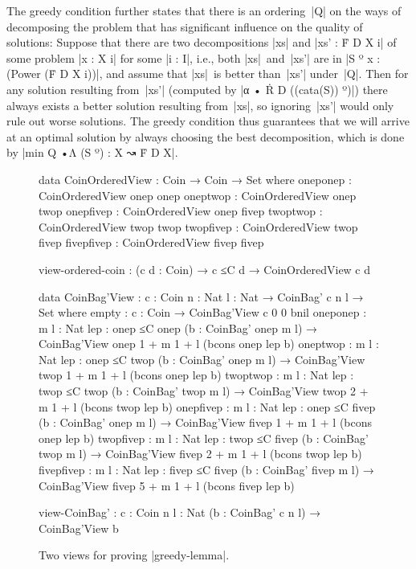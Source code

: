 The greedy condition further states that there is an ordering~|Q| on the ways of decomposing the problem that has significant influence on the quality of solutions:
Suppose that there are two decompositions |xs| and |xs' : Ḟ D X i| of some problem |x : X i| for some |i : I|, i.e., both |xs|~and~|xs'| are in |S º x : (Power (Ḟ D X i))|, and assume that |xs|~is better than~|xs'| under~|Q|.
Then for any solution resulting from~|xs'| (computed by |α • Ṙ D ((cata(S)) º)|) there always exists a better solution resulting from~|xs|, so ignoring~|xs'| would only rule out worse solutions.
The greedy condition thus guarantees that we will arrive at an optimal solution by always choosing the best decomposition, which is done by |min Q •Λ (S º) : X ↝ Ḟ D X|.

\begin{figure}
\codefigure\fontsize{10.6pt}{0pt}
\begin{code}
data CoinOrderedView : Coin → Coin → Set where
  oneponep    : CoinOrderedView  onep   onep
  oneptwop    : CoinOrderedView  onep   twop
  onepfivep   : CoinOrderedView  onep   fivep
  twoptwop    : CoinOrderedView  twop   twop
  twopfivep   : CoinOrderedView  twop   fivep
  fivepfivep  : CoinOrderedView  fivep  fivep

view-ordered-coin : (c d : Coin) → c ≤C d → CoinOrderedView c d

data CoinBag'View : {c : Coin} {n : Nat} {l : Nat} → CoinBag' c n l → Set where
  empty       :  {c : Coin} → CoinBag'View {c} {0} {0} bnil
  oneponep    :  {m l : Nat} {lep : onep ≤C onep}
                 (b : CoinBag' onep m l) → CoinBag'View {onep} {1 + m} {1 + l} (bcons onep lep b)
  oneptwop    :  {m l : Nat} {lep : onep ≤C twop}
                 (b : CoinBag' onep m l) → CoinBag'View {twop} {1 + m} {1 + l} (bcons onep lep b)
  twoptwop    :  {m l : Nat} {lep : twop ≤C twop}
                 (b : CoinBag' twop m l) → CoinBag'View {twop} {2 + m} {1 + l} (bcons twop lep b)
  onepfivep   :  {m l : Nat} {lep : onep ≤C fivep}
                 (b : CoinBag' onep m l) → CoinBag'View {fivep} {1 + m} {1 + l} (bcons onep lep b)
  twopfivep   :  {m l : Nat} {lep : twop ≤C fivep}
                 (b : CoinBag' twop m l) → CoinBag'View {fivep} {2 + m} {1 + l} (bcons twop lep b)
  fivepfivep  :  {m l : Nat} {lep : fivep ≤C fivep}
                 (b : CoinBag' fivep m l) → CoinBag'View {fivep} {5 + m} {1 + l} (bcons fivep lep b)

view-CoinBag' : {c : Coin} {n l : Nat} (b : CoinBag' c n l) → CoinBag'View b
\end{code}
\caption{Two views for proving |greedy-lemma|.}
\label{fig:greedy-lemma-views}
\end{figure}

